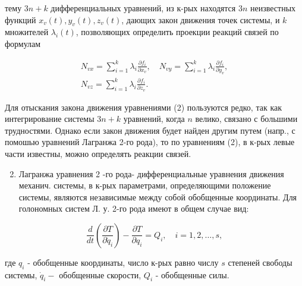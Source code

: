 \documentclass[10pt]{article}
\begin{document}
тему $3 n+k$ дифференциальных уравнений, из к-рых находятся $3 n$ неизвестных функций $x_{v}(t), y_{v}(t), z_{v}(t)$, дающих закон движения точек системы, и $k$ множителей $\lambda_{i}(t)$, позволяющих определить проекции реакций связей по формулам



\[

\begin{gathered}

N_{v x}=\sum_{i=1}^{k} \lambda_{i} \frac{\partial f_{i}}{\partial x_{v}}, \quad N_{v y}=\sum_{i=1}^{k} \lambda_{i} \frac{\partial f_{i}}{\partial y_{v}}, \\

N_{v z}=\sum_{i=1}^{k} \lambda_{i} \frac{\partial f_{i}}{\partial z_{v}} .

\end{gathered}

\]



Для отыскания закона движения уравнениями (2) пользуются редко, так как интегрирование системы $3 n+k$ уравнений, когда $n$ велико, связано с большими трудностями. Однако если закон движения будет найден другим путем (напр., с помошью уравнений Лагранжа 2-го рода), то по уравнениям (2), в к-рых левые части известны, можно определять реакции связей.



\begin{enumerate}

  \setcounter{enumi}{1}

  \item Лагранжа уравнения 2 -го рода- дифференциальные уравнения движения механич. системы, в к-рых параметрами, определяющими положение системы, являются независимые между собой обобщенные координаты. Для голономных систем Л. у. 2-го рода имеют в общем случае вид:

\end{enumerate}



\[

\frac{d}{d t}\left(\frac{\partial T}{\partial \dot{q}_{i}}\right)-\frac{\partial T}{\partial q_{i}}=Q_{i}, \quad i=1,2, \ldots, s,

\]



где $q_{i}$ - обобщенные координаты, число к-рых равно числу $s$ степеней свободы системы, $\dot{q}_{i}-$ обобщенные скорости, $Q_{i}$ - обобщенные силы.
\end{document}

